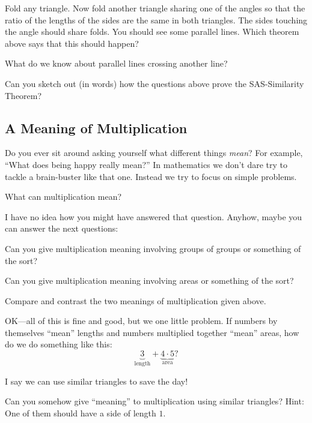 \begin{question}
Fold any triangle. Now fold another triangle sharing one of the angles
so that the ratio of the lengths of the sides are the same in both
triangles. The sides touching the angle should share folds. You should
see some parallel lines. Which theorem above says that this should
happen?
\end{question}
\QM

\begin{question} 
What do we know about parallel lines crossing another line?
\end{question}
\QM

\begin{question} 
Can you sketch out (in words) how the questions above prove the SAS-Similarity
Theorem?
\end{question}
\QM


\subsection{A Meaning of Multiplication}

Do you ever sit around asking yourself what different things
\textit{mean}? For example, ``What does being happy really mean?'' In
mathematics we don't dare try to tackle a brain-buster like that
one. Instead we try to focus on simple problems.

\begin{question} What can multiplication mean? 
\end{question}
\QM

I have no idea how you might have answered that question. Anyhow,
maybe you can answer the next questions:

\begin{question} 
Can you give multiplication meaning involving groups of groups or
something of the sort?
\end{question}
\QM

\begin{question} 
Can you give multiplication meaning involving areas or something of
the sort?
\end{question}
\QM

\begin{question}
Compare and contrast the two meanings of multiplication given above.
\end{question}

OK---all of this is fine and good, but we one little problem. If
numbers by themselves ``mean'' lengths and numbers multiplied together
``mean'' areas, how do we do something like this:
\[
\underbrace{3}_\text{length} + \underbrace{4\cdot 5}_\text{area}?
\]


I say we can use similar triangles to save the day!


\begin{question} 
Can you somehow give ``meaning'' to multiplication using similar
triangles? Hint: One of them should have a side of length $1$.
\end{question}
\QM

